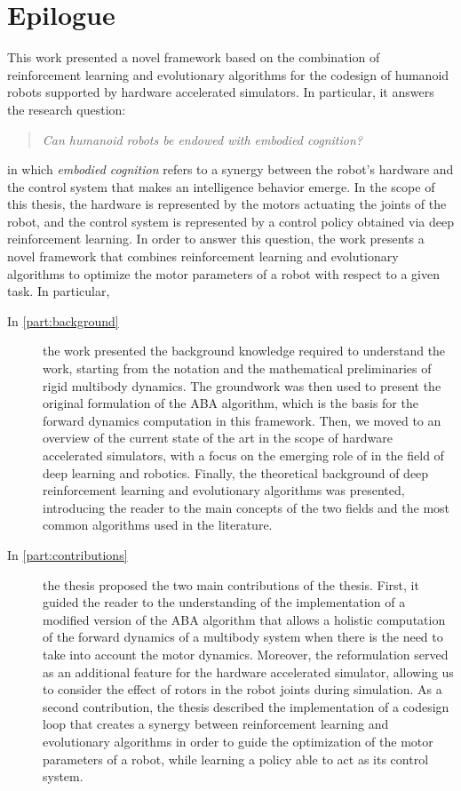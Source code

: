 \chapter*{Epilogue}
\label{chp:99-Epilogue}

This work presented a novel framework based on the combination of reinforcement learning and evolutionary algorithms for the codesign of humanoid robots supported by hardware accelerated simulators. In particular, it answers the research question:

\begin{quote}
    \textit{
        Can humanoid robots be endowed with embodied cognition?}
\end{quote}

in which \textit{embodied cognition} refers to a synergy between the robot's hardware and the control system that makes an intelligence behavior emerge. In the scope of this thesis, the hardware is represented by the motors actuating the joints of the robot, and the control system is represented by a control policy obtained via deep reinforcement learning.
In order to answer this question, the work presents a novel framework that combines reinforcement learning and evolutionary algorithms to optimize the motor parameters of a robot with respect to a given task. In particular,

\begin{description}
    \item[In \cref{part:background}] the work presented the background knowledge required to understand the work, starting from the notation and the mathematical preliminaries of rigid multibody dynamics. The groundwork was then used to present the original formulation of the \ac{ABA} algorithm, which is the basis for the forward dynamics computation in this framework. Then, we moved to an overview of the current state of the art in the scope of hardware accelerated simulators, with a focus on the emerging role of \jax in the field of deep learning and robotics. Finally, the theoretical background of deep reinforcement learning and evolutionary algorithms was presented, introducing the reader to the main concepts of the two fields and the most common algorithms used in the literature.
    \item[In \cref{part:contributions}] the thesis proposed the two main contributions of the thesis. First, it guided the reader to the understanding of the implementation of a modified version of the \ac{ABA} algorithm that allows a holistic computation of the forward dynamics of a multibody system when there is the need to take into account the motor dynamics. Moreover, the reformulation served as an additional feature for the hardware accelerated \jaxsim simulator, allowing us to consider the effect of rotors in the robot joints during simulation. As a second contribution, the thesis described the implementation of a codesign loop that creates a synergy between reinforcement learning and evolutionary algorithms in order to guide the optimization of the motor parameters of a robot, while learning a policy able to act as its control system.
\end{description}


